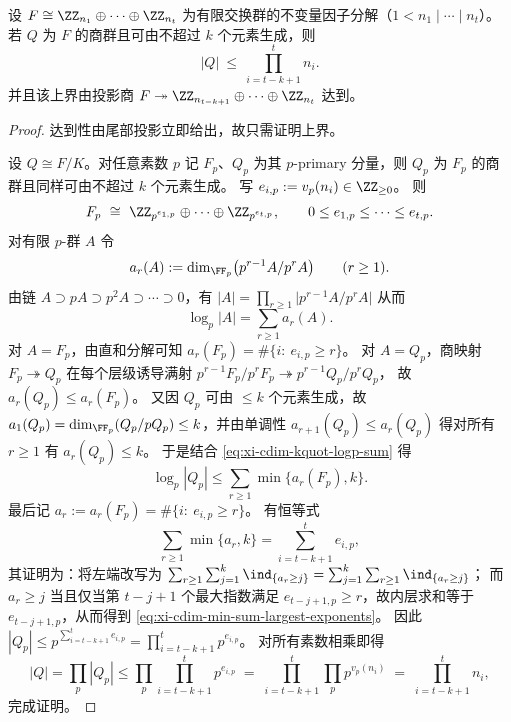 \begin{lemma}\label{lem:xi-cdim-k-generated-quotient-max-order}
设 \(F\cong \ZZ_{n_1}\oplus\cdots\oplus\ZZ_{n_t}\) 为有限交换群的不变量因子分解（\(1<n_1\mid\cdots\mid n_t\)）。
若 \(Q\) 为 \(F\) 的商群且可由不超过 \(k\) 个元素生成，则
\[
|Q|\ \le\ \prod_{i=t-k+1}^{t}n_i.
\]
并且该上界由投影商 \(F\twoheadrightarrow \ZZ_{n_{t-k+1}}\oplus\cdots\oplus\ZZ_{n_t}\) 达到。
\end{lemma}
\begin{proof}
达到性由尾部投影立即给出，故只需证明上界。
\par
设 \(Q\cong F/K\)。对任意素数 \(p\) 记 \(F_p\)、\(Q_p\) 为其 \(p\)-primary 分量，则 \(Q_p\) 为 \(F_p\) 的商群且同样可由不超过 \(k\) 个元素生成。
写
\(
e_{i,p}:=v_p(n_i)\in\ZZ_{\ge 0}
\)。
则
\[
F_p\ \cong\ \ZZ_{p^{e_{1,p}}}\oplus\cdots\oplus\ZZ_{p^{e_{t,p}}},\qquad
0\le e_{1,p}\le\cdots\le e_{t,p}.
\]
对有限 \(p\)-群 \(A\) 令
\[
a_r(A):=\dim_{\FF_p}\bigl(p^{r-1}A/p^rA\bigr)\qquad(r\ge 1).
\]
由链 \(A\supset pA\supset p^2A\supset\cdots\supset 0\)，有
\(
|A|=\prod_{r\ge 1}\bigl|p^{r-1}A/p^rA\bigr|
\)
从而
\begin{equation}\label{eq:xi-cdim-kquot-logp-sum}
\log_p|A|=\sum_{r\ge 1}a_r(A).
\end{equation}
对 \(A=F_p\)，由直和分解可知
\(
a_r(F_p)=\#\{i:\ e_{i,p}\ge r\}
\)。
对 \(A=Q_p\)，商映射 \(F_p\twoheadrightarrow Q_p\) 在每个层级诱导满射
\(
p^{r-1}F_p/p^rF_p \twoheadrightarrow p^{r-1}Q_p/p^rQ_p
\)，
故
\(
a_r(Q_p)\le a_r(F_p)
\)。
又因 \(Q_p\) 可由 \(\le k\) 个元素生成，故
\(
a_1(Q_p)=\dim_{\FF_p}(Q_p/pQ_p)\le k
\)，并由单调性 \(a_{r+1}(Q_p)\le a_r(Q_p)\) 得对所有 \(r\ge 1\) 有 \(a_r(Q_p)\le k\)。
于是结合 \eqref{eq:xi-cdim-kquot-logp-sum} 得
\[
\log_p|Q_p|
\le
\sum_{r\ge 1}\min\{a_r(F_p),k\}.
\]
最后记 \(a_r:=a_r(F_p)=\#\{i:\ e_{i,p}\ge r\}\)。
有恒等式
\begin{equation}\label{eq:xi-cdim-min-sum-largest-exponents}
\sum_{r\ge 1}\min\{a_r,k\}=\sum_{i=t-k+1}^{t}e_{i,p},
\end{equation}
其证明为：将左端改写为
\(
\sum_{r\ge 1}\sum_{j=1}^{k}\ind_{\{a_r\ge j\}}
=\sum_{j=1}^{k}\sum_{r\ge 1}\ind_{\{a_r\ge j\}}
\)；
而 \(a_r\ge j\) 当且仅当第 \(t-j+1\) 个最大指数满足 \(e_{t-j+1,p}\ge r\)，故内层求和等于 \(e_{t-j+1,p}\)，从而得到 \eqref{eq:xi-cdim-min-sum-largest-exponents}。
因此
\(
|Q_p|\le p^{\sum_{i=t-k+1}^{t}e_{i,p}}=\prod_{i=t-k+1}^{t}p^{e_{i,p}}
\)。
对所有素数相乘即得
\[
|Q|=\prod_{p}|Q_p|
\le
\prod_{p}\prod_{i=t-k+1}^{t}p^{e_{i,p}}
\;=\;
\prod_{i=t-k+1}^{t}\prod_{p}p^{v_p(n_i)}
\;=\;
\prod_{i=t-k+1}^{t}n_i,
\]
完成证明。
\end{proof}

